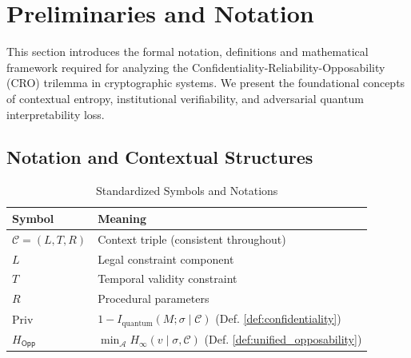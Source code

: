 \documentclass[preprint,12pt]{elsarticle}
\begin{document}
    \section{Preliminaries and Notation}
        \label{sec:prelim}

        This section introduces the formal notation, definitions and mathematical framework required for analyzing the Confidentiality-Reliability-Opposability (CRO) trilemma in cryptographic systems. We present the foundational concepts of contextual entropy, institutional verifiability, and adversarial quantum interpretability loss.

        \subsection{Notation and Contextual Structures}
            \label{subsec:notation_context}
            \begin{table}[H]
                \centering
                \caption{Standardized Symbols and Notations}
                \label{tab:notation}
                \renewcommand{\arraystretch}{1.2}
                \begin{tabular}{@{}ll@{}}
                    \toprule
                    \textbf{Symbol} & \textbf{Meaning} \\
                    \midrule
                    $\mathcal{C} = (L, T, R)$ & Context triple (consistent throughout) \\
                    $L$ & Legal constraint component \\
                    $T$ & Temporal validity constraint \\
                    $R$ & Procedural parameters \\
                    $\mathrm{Priv}$ & $1 - I_{\text{quantum}}(M; \sigma \mid \mathcal{C})$ (Def. \ref{def:confidentiality}) \\
                    $H_{\mathsf{Opp}}$ & $\min_{\mathcal{A}} H_\infty(v \mid \sigma, \mathcal{C})$ (Def. \ref{def:unified_opposability}) \\
                    \bottomrule
                \end{tabular}
            \end{table}
\end{document}
